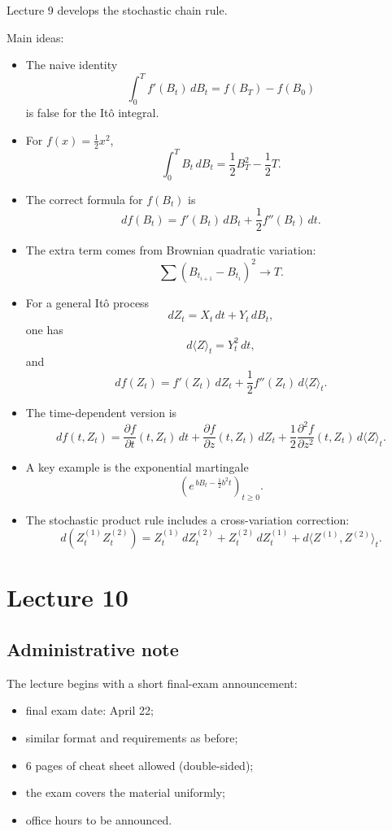 \documentclass[11pt]{article}
\theoremstyle{definition}
\begin{document}
\begin{summarybox}
Lecture 9 develops the stochastic chain rule.

Main ideas:
\begin{itemize}[leftmargin=2em]
    \item The naive identity
    \[
    \int_0^T f'(B_t)\,dB_t=f(B_T)-f(B_0)
    \]
    is false for the It\^o integral.
    \item For \(f(x)=\frac12 x^2\),
    \[
    \int_0^T B_t\,dB_t=\frac12 B_T^2-\frac12 T.
    \]
    \item The correct formula for \(f(B_t)\) is
    \[
    df(B_t)=f'(B_t)\,dB_t+\frac12 f''(B_t)\,dt.
    \]
    \item The extra term comes from Brownian quadratic variation:
    \[
    \sum (B_{t_{i+1}}-B_{t_i})^2\to T.
    \]
    \item For a general It\^o process
    \[
    dZ_t=X_t\,dt+Y_t\,dB_t,
    \]
    one has
    \[
    d\langle Z\rangle_t=Y_t^2\,dt,
    \]
    and
    \[
    df(Z_t)=f'(Z_t)\,dZ_t+\frac12 f''(Z_t)\,d\langle Z\rangle_t.
    \]
    \item The time-dependent version is
    \[
    df(t,Z_t)
    =
    \frac{\partial f}{\partial t}(t,Z_t)\,dt
    +
    \frac{\partial f}{\partial z}(t,Z_t)\,dZ_t
    +
    \frac12\frac{\partial^2 f}{\partial z^2}(t,Z_t)\,d\langle Z\rangle_t.
    \]
    \item A key example is the exponential martingale
    \[
    \left(e^{\,bB_t-\frac12 b^2 t}\right)_{t\ge 0}.
    \]
    \item The stochastic product rule includes a cross-variation correction:
    \[
    d(Z^{(1)}_tZ^{(2)}_t)
    =
    Z_t^{(1)}\,dZ_t^{(2)}
    +
    Z_t^{(2)}\,dZ_t^{(1)}
    +
    d\langle Z^{(1)},Z^{(2)}\rangle_t.
    \]
\end{itemize}
\end{summarybox}

\clearpage
\section{Lecture 10}

\subsection{Administrative note}

The lecture begins with a short final-exam announcement:
\begin{itemize}[leftmargin=2em]
    \item final exam date: April 22;
    \item similar format and requirements as before;
    \item 6 pages of cheat sheet allowed (double-sided);
    \item the exam covers the material uniformly;
    \item office hours to be announced.
\end{itemize}
\end{document}
